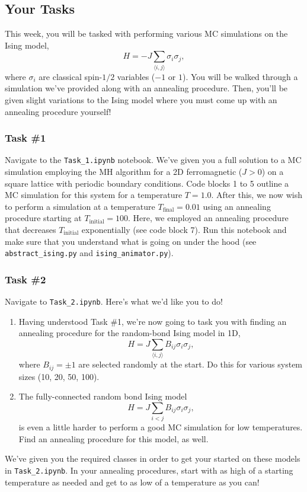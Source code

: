 \documentclass[12pt]{article}
\begin{document}
\subsection*{Your Tasks}

This week, you will be tasked with performing various MC simulations on the Ising model,
\begin{equation}
    H = -J\sum_{\langle i,j \rangle} \sigma_i \sigma_j,
\end{equation}
where $\sigma_i$ are classical spin-$1/2$ variables ($-1$ or $1$). You will be walked through a simulation we've provided along with an annealing procedure. Then, you'll be given slight variations to the Ising model where you must come up with an annealing procedure yourself!

\subsubsection*{Task \#1}

Navigate to the \texttt{Task\_1.ipynb} notebook. We've given you a full solution to a MC simulation employing the MH algorithm for a 2D ferromagnetic ($J > 0$) on a square lattice with periodic boundary conditions. Code blocks 1 to 5 outline a MC simulation for this system for a temperature $T = 1.0$. After this, we now wish to perform a simulation at a temperature $T_{\text{final}} = 0.01$ using an annealing procedure starting at $T_{\text{initial}} = 100$. Here, we employed an annealing procedure that decreases $T_{\text{initial}}$ exponentially (see code block 7). Run this notebook and make sure that you understand what is going on under the hood (see \texttt{abstract\_ising.py} and \texttt{ising\_animator.py}).

\subsubsection*{Task \#2}
Navigate to \texttt{Task\_2.ipynb}. Here's what we'd like you to do!
\begin{enumerate}
    \item Having understood Task \#1, we're now going to task you with finding an annealing procedure for the random-bond Ising model in 1D,
    \begin{equation}
        H = J\sum_{\langle i,j \rangle} B_{ij}\sigma_i\sigma_j,
    \end{equation}
    where $B_{ij} = \pm 1$ are selected randomly at the start. Do this for various system sizes (10, 20, 50, 100).
    \item The fully-connected random bond Ising model
    \begin{equation}
        H = J \sum_{i < j} B_{ij}\sigma_i\sigma_j,
    \end{equation}
    is even a little harder to perform a good MC simulation for low temperatures. Find an annealing procedure for this model, as well.
\end{enumerate}
We've given you the required classes in order to get your started on these models in \texttt{Task\_2.ipynb}. In your annealing procedures, start with as high of a starting temperature as needed and get to as low of a temperature as you can!
\end{document}
